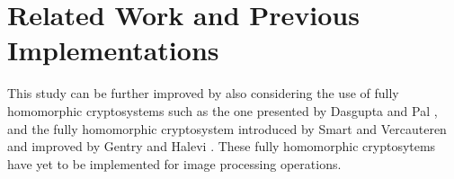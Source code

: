 \section{Related Work and Previous Implementations}








This study can be further improved by also considering the use of fully homomorphic cryptosystems such as the one presented by Dasgupta and Pal \cite{dasgupta_design_2016}, and the fully homomorphic cryptosystem introduced by Smart and Vercauteren \cite{hutchison_fully_2010} and improved by Gentry and Halevi  \cite{hutchison_implementing_2011}. These fully homomorphic cryptosytems have yet to be implemented for image processing operations.


